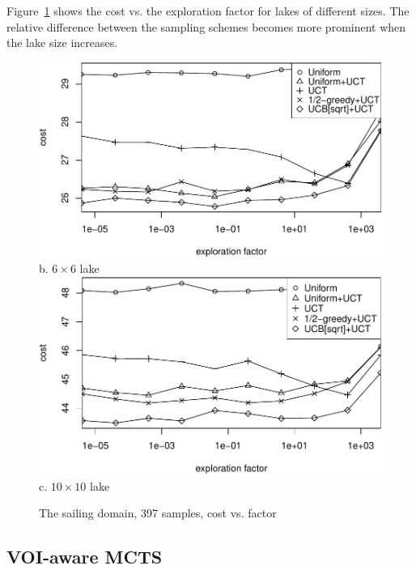 \documentclass[letterpaper]{article}
\begin{document}
Figure~\ref{fig:sailing-lake-size} shows the cost vs. the exploration
factor for lakes of different sizes. The relative difference between
the sampling schemes becomes more prominent when the lake size
increases.
\begin{figure}[h!]
   \centering
   \includegraphics[scale=0.425]{costs-size=6-nsamples=397.pdf}\\
   b. $6\times 6$ lake \\
   \vspace{0.5em}
   \includegraphics[scale=0.425]{costs-size=10-nsamples=397.pdf}\\
   c. $10\times 10$ lake
  \caption{The sailing domain, 397 samples, cost vs. factor}
  \label{fig:sailing-lake-size}
\end{figure}

\subsection{VOI-aware MCTS}
\end{document}
